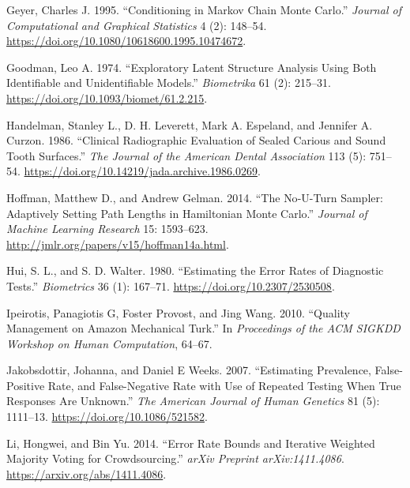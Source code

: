 \begin{CSLReferences}{1}{0}
\leavevmode{}%
Geyer, Charles J. 1995. {``Conditioning in {M}arkov Chain {M}onte {C}arlo.''} \emph{Journal of Computational and Graphical Statistics} 4 (2): 148--54. \url{https://doi.org/10.1080/10618600.1995.10474672}.

\leavevmode{}%
Goodman, Leo A. 1974. {``Exploratory Latent Structure Analysis Using Both Identifiable and Unidentifiable Models.''} \emph{Biometrika} 61 (2): 215--31. \url{https://doi.org/10.1093/biomet/61.2.215}.

\leavevmode{}%
Handelman, Stanley L., D. H. Leverett, Mark A. Espeland, and Jennifer A. Curzon. 1986. {``Clinical Radiographic Evaluation of Sealed Carious and Sound Tooth Surfaces.''} \emph{The Journal of the American Dental Association} 113 (5): 751--54. \url{https://doi.org/10.14219/jada.archive.1986.0269}.

\leavevmode{}%
Hoffman, Matthew D., and Andrew Gelman. 2014. {``The {No}-{U}-{Turn} {Sampler}: Adaptively Setting Path Lengths in {Hamiltonian} {Monte} {Carlo}.''} \emph{Journal of Machine Learning Research} 15: 1593--623. \url{http://jmlr.org/papers/v15/hoffman14a.html}.

\leavevmode{}%
Hui, S. L., and S. D. Walter. 1980. {``Estimating the {Error} {Rates} of {Diagnostic} {Tests}.''} \emph{Biometrics} 36 (1): 167--71. \url{https://doi.org/10.2307/2530508}.

\leavevmode{}%
Ipeirotis, Panagiotis G, Foster Provost, and Jing Wang. 2010. {``Quality Management on {A}mazon {M}echanical {T}urk.''} In \emph{Proceedings of the ACM SIGKDD Workshop on Human Computation}, 64--67.

\leavevmode{}%
Jakobsdottir, Johanna, and Daniel E Weeks. 2007. {``Estimating Prevalence, False-Positive Rate, and False-Negative Rate with Use of Repeated Testing When True Responses Are Unknown.''} \emph{The American Journal of Human Genetics} 81 (5): 1111--13. \url{https://doi.org/10.1086/521582}.

\leavevmode{}%
Li, Hongwei, and Bin Yu. 2014. {``Error {Rate} {Bounds} and {Iterative} {Weighted} {Majority} {Voting} for {Crowdsourcing}.''} \emph{arXiv Preprint arXiv:1411.4086}. \url{https://arxiv.org/abs/1411.4086}.


\end{CSLReferences}
